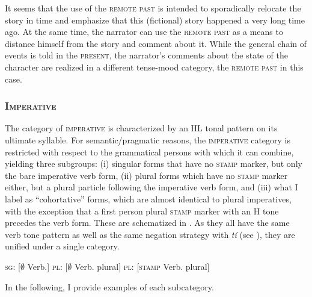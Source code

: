 It seems that the use of the \textsc{remote past} is intended to sporadically relocate the story in time and emphasize that this (fictional) story happened a very long time ago. At the same time, the narrator can use the \textsc{remote past} as a means to distance himself from the story and comment about it. While the general chain of events is told in the \textsc{present}, the narrator's comments about the state of the character are realized in a different tense-mood category, the \textsc{remote past} in this case. 









\subsubsection{\textsc{Imperative}}
\label{sec:imp}


The category of  \textsc{imperative} is characterized by an HL tonal pattern on its ultimate syllable.
For semantic/pragmatic reasons, the \textsc{imperative} category is restricted with respect to the grammatical persons with which it can combine, yielding three subgroups: (i) singular forms that have no \textsc{stamp} marker, but only the bare imperative verb form, (ii) plural forms which have no \textsc{stamp} marker either, but a plural particle following the imperative verb form, and (iii) what I label as ``cohortative''  forms, which are almost identical to plural imperatives, with the exception that a  first person plural \textsc{stamp} marker with an H tone precedes the verb form. These are schematized  in . As they all have the same verb tone pattern as well as the same negation strategy with {\itshape tí} (see ), they are unified under a single category.

\ea\label{IMPstruc}
\textsc{sg}: [$\emptyset$  Verb.{\IMP}]
\textsc{pl}: [$\emptyset$  Verb.{\IMP} plural]
\textsc{pl}: [\textsc{stamp}  Verb.{\IMP} plural]
\z
\z


\noindent In the following, I provide examples of each subcategory.







